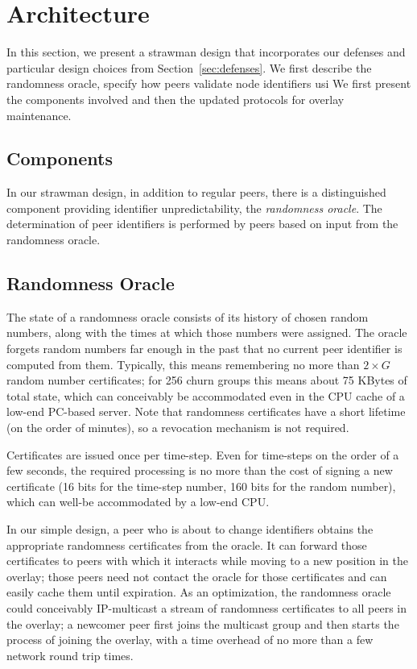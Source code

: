 \section{Architecture}
\label{sec:arch}
In this section, we present a strawman design that incorporates our
defenses and particular design choices from Section~\ref{sec:defenses}.
We first describe the randomness oracle, specify how peers validate node
identifiers usi
We first present the components involved and then the updated protocols
for overlay maintenance.

\subsection{Components}
In our strawman design, in addition to regular peers, there is a
distinguished component providing
identifier unpredictability, the \emph{randomness oracle}.  The
determination of peer identifiers is performed by peers based on input
from the randomness oracle.


\subsection{Randomness Oracle}
\label{sec:epoch_server}
The state of a randomness oracle consists of its history of chosen
random numbers, along with the times at which those numbers were
assigned.  The oracle forgets random numbers far enough in the past that
no current peer identifier is computed from them.  Typically, this means
remembering no more than $2 \times G$ random number certificates; for
256 churn groups this means about 75 KBytes of total state, which can
conceivably be accommodated even in the CPU cache of a low-end PC-based
server. Note that randomness certificates have a short lifetime (on the
order of minutes), so a revocation mechanism is not required.

Certificates are issued once per time-step.  Even for time-steps on the
order of a few seconds, the required processing is no more than the cost
of signing a new certificate (16 bits for the time-step number, 160 bits
for the random number), which can well-be accommodated by a low-end CPU.

In our simple design, a peer who is about to change identifiers obtains
the appropriate randomness certificates from the oracle.  It can forward
those certificates to peers with which it interacts
while moving to a new position in the overlay; those peers need not
contact the oracle for those certificates and can easily cache them
until expiration. As an optimization, the randomness oracle could
conceivably IP-multicast a stream of randomness certificates to all peers
in the overlay; a newcomer peer first joins the multicast group and then
starts the process of joining the overlay, with a time overhead of no more
than a few
network round trip times.


